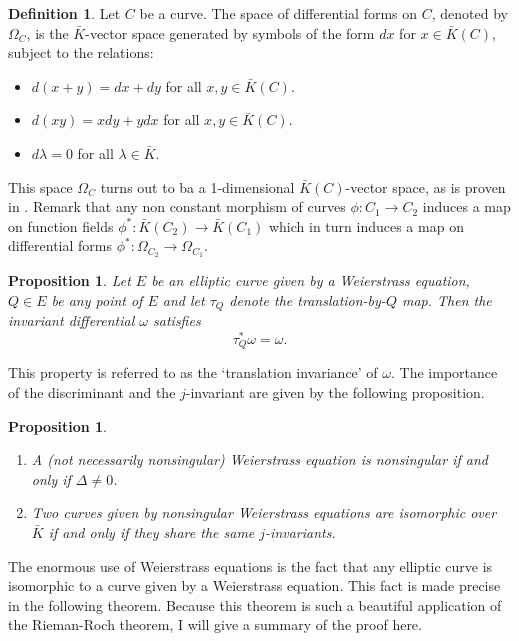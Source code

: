 \documentclass{article}
\numberwithin{equation}{section}
\newtheorem{proposition}[theorem]{Proposition}
\theoremstyle{definition}
\newtheorem{definition}[theorem]{Definition}
\begin{document}
\begin{definition}\label{diffdef}
Let $C$ be a curve. The space of differential forms on $C$, denoted by $\Omega_C$, is the $\bar{K}$-vector space generated by symbols of the form $dx$ for $x \in \bar{K}(C)$, subject to the relations:
\begin{itemize}
\item $d(x+y)=dx+dy$ for all $x,y\in\bar{K}(C)$.
\item $d(xy)=xdy+ydx$ for all $x,y \in \bar{K}(C)$. 
\item $d\lambda = 0$ for all $\lambda \in \bar{K}$.
\end{itemize}
\end{definition}

This space $\Omega_C$ turns out to ba a 1-dimensional $\bar{K}(C)$-vector space, as is proven in \cite[II.4.2]{Silverman}.
Remark that any non constant morphism of curves $\phi:C_1 \rightarrow C_2$ induces a map on function fields $\phi^*: \bar{K}(C_2) \rightarrow \bar{K}(C_1)$ which in turn induces a map on differential forms $\phi^*: \Omega_{C_2} \rightarrow \Omega_{C_1}$.

\begin{proposition}\label{translationinvariance}
Let $E$ be an elliptic curve given by a Weierstrass equation, $Q\in E$ be any point of $E$ and let $\tau_Q$ denote the translation-by-$Q$ map. Then the invariant differential $\omega$ satisfies $$\tau_Q^* \omega = \omega.$$
\end{proposition}

This property is referred to as the `translation invariance' of $\omega$. The importance of the discriminant and the $j$-invariant are given by the following proposition.

\begin{proposition}\label{disc&jinv}
\begin{enumerate}
\item A (not necessarily nonsingular) Weierstrass equation is nonsingular if and only if $\Delta \neq 0$.
\item Two curves given by nonsingular Weierstrass equations are isomorphic over $\bar{K}$ if and only if they share the same $j$-invariants.
\end{enumerate}
\end{proposition}

The enormous use of Weierstrass equations is the fact that any elliptic curve is isomorphic to a curve given by a Weierstrass equation. This fact is made precise in the following theorem. Because this theorem is such a beautiful application of the Rieman-Roch theorem, I will give a summary of the proof here.
\end{document}
